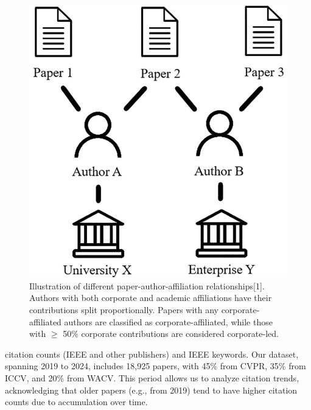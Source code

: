 \documentclass{article}
\begin{document}
\begin{figure}
\vspace{-100pt}
\centering
\includegraphics[width=.95\linewidth]{report/images/affiliation-combination.png}
\caption{Illustration of different paper-author-affiliation relationships[1]. Authors with both corporate and academic affiliations have their contributions split proportionally. Papers with any corporate-affiliated authors are classified as corporate-affiliated, while those with $\geq$ 50\% corporate contributions are considered corporate-led.}
\vspace{-10pt}
\label{fig:affiliation-combination}
\vspace{-20pt}
\end{figure}
citation counts (IEEE  and other publishers) and IEEE keywords. Our dataset, spanning 2019 to 2024, includes 18,925 papers, with 45\% from CVPR, 35\% from ICCV, and 20\% from WACV. This period allows us to analyze citation trends, acknowledging that older papers (e.g., from 2019) tend to have higher citation counts due to accumulation over time.
\end{document}
